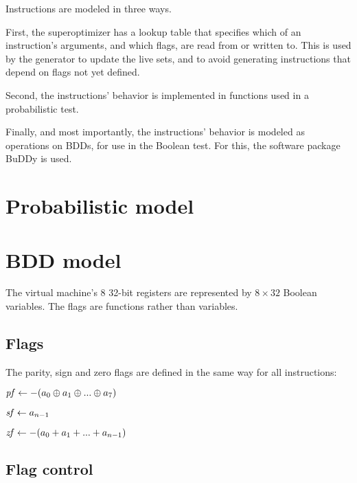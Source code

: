 \documentclass[a4paper,11pt]{kth-mag}
\renewcommand{\gets}{\leftarrow}
\newcommand{\IOR}{+}
\newcommand{\XOR}{\oplus}
\newcommand{\NOT}{-}
\begin{document}

Instructions are modeled in three ways.

First, the superoptimizer has a lookup table that specifies which of an instruction's arguments, and which flags, are read from or written to.
This is used by the generator to update the live sets, and to avoid generating instructions that depend on flags not yet defined.

Second, the instructions' behavior is implemented in functions used in a probabilistic test.

Finally, and most importantly, the instructions' behavior is modeled as operations on BDDs, for use in the Boolean test.
For this, the software package BuDDy \cite{buddy} is used.

\section{Probabilistic model}

\section{BDD model}

The virtual machine's 8 32-bit registers are represented by $8 \times 32$ Boolean variables. %
The flags are functions rather than variables.

\subsection{Flags}

The parity, sign and zero flags are defined in the same way for all instructions:

\begin{codebox}
\zi $\id{pf} \gets \NOT(a_0 \XOR a_1 \XOR ... \XOR a_7)$
\end{codebox}

\begin{codebox}
\zi $\id{sf} \gets a_{n-1}$
\end{codebox}

\begin{codebox}
\zi $\id{zf} \gets \NOT(a_0 \IOR a_1 \IOR ... \IOR a_{n-1})$
\end{codebox}

\subsection{Flag control}
\end{document}

